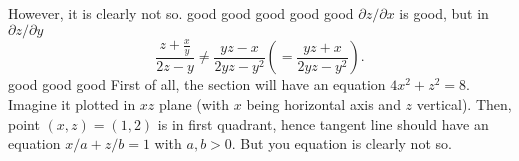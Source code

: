 \documentclass[pstricks,10pt,dvipsnames]{article} %
\begin{document}
However, it is clearly not so.
good
good
good
good
good
$\partial z/\partial x$ is good, but in $\partial z/\partial y$
\begin{equation*}
	\frac{z+\frac{x}{y}}{2z-y}\neq\frac{yz-x}{2yz-y^2}\left( =\frac{yz+x}{2yz-y^2} \right).
\end{equation*}
good
good
good
First of all, the section will have an equation $4x^2+z^2=8$. Imagine it plotted in $xz$ plane (with $x$
being horizontal axis and $z$ vertical). Then, point $(x,z)=(1,2)$ is in first quadrant, hence tangent line
should have an equation $x/a+z/b=1$ with $a,b>0$. But you equation is clearly not so.
\end{document}
